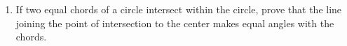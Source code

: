 \renewcommand{\theequation}{\theenumi}
\begin{enumerate}[label=\thesection.\arabic*.,ref=\thesection.\theenumi]

\item If two equal chords of a circle intersect within the circle, prove that the line joining the point of intersection to the center makes equal angles with the chords.
\end{enumerate}


